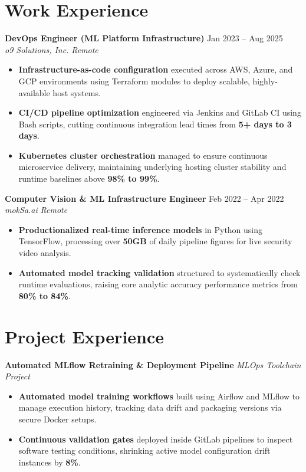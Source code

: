 \documentclass[11pt,letterpaper]{article}
\begin{document}
\section*{Work Experience}
\noindent \textbf{DevOps Engineer (ML Platform Infrastructure)} \hfill Jan 2023 -- Aug 2025 \\
\textit{o9 Solutions, Inc.} \hfill \textit{Remote}
\begin{itemize}
\item \textbf{Infrastructure-as-code configuration} executed across AWS, Azure, and GCP environments using Terraform modules to deploy scalable, highly-available host systems.
\item \textbf{CI/CD pipeline optimization} engineered via Jenkins and GitLab CI using Bash scripts, cutting continuous integration lead times from \textbf{5+ days to 3 days}.
\item \textbf{Kubernetes cluster orchestration} managed to ensure continuous microservice delivery, maintaining underlying hosting cluster stability and runtime baselines above \textbf{98\% to 99\%}.
\end{itemize}
\noindent \textbf{Computer Vision \& ML Infrastructure Engineer} \hfill Feb 2022 -- Apr 2022 \\
\textit{mokSa.ai} \hfill \textit{Remote}
\begin{itemize}
\item \textbf{Productionalized real-time inference models} in Python using TensorFlow, processing over \textbf{50GB} of daily pipeline figures for live security video analysis.
\item \textbf{Automated model tracking validation} structured to systematically check runtime evaluations, raising core analytic accuracy performance metrics from \textbf{80\% to 84\%}.
\end{itemize}
\section*{Project Experience}
\noindent \textbf{Automated MLflow Retraining \& Deployment Pipeline} \hfill \textit{MLOps Toolchain Project}
\begin{itemize}
\item \textbf{Automated model training workflows} built using Airflow and MLflow to manage execution history, tracking data drift and packaging versions via secure Docker setups.
\item \textbf{Continuous validation gates} deployed inside GitLab pipelines to inspect software testing conditions, shrinking active model configuration drift instances by \textbf{8\%}.
\end{itemize}
\end{document}
